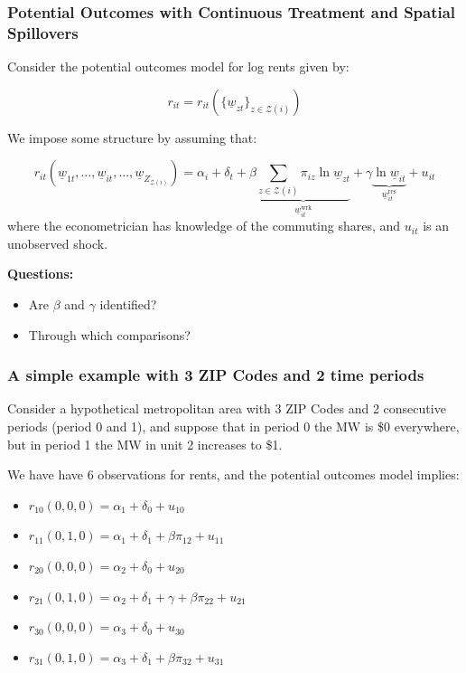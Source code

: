 \documentclass[aspectratio=169, t]{beamer}
\newcommand{\Z}{\mathcal{Z}}
\newcommand{\MW}{\underline{w}}
\begin{document}
\begin{frame}
	\frametitle{Potential Outcomes with Continuous Treatment and Spatial Spillovers}
	Consider the potential outcomes model for log rents given by:

	\[
	r_{it}=r_{it}\left(\{\underline{w}_{zt}\}_{z\in\Z(i)}\right)
	\]

	We impose some structure by assuming that:

	\[
	r_{it}(\underline{w}_{1t},...,\underline{w}_{it}, ..., \underline{w}_{Z_{\Z(i)}}) = \alpha_{i} + 
	\delta_{t} + \beta \underbrace{\sum_{z\in\Z(i)}\pi_{iz}\ln \underline{w}_{zt}}_{\MW^{\text{wrk}}_{it}} +
	\gamma \underbrace{\ln \underline{w}_{it}}_{\MW^{\text{res}}_{it}} + u_{it}
	\]
	where the econometrician has knowledge of the commuting shares, and $u_{it}$ is an unobserved shock.

	\pause 

	\vspace{2mm}

	\textbf{Questions:} 
	\begin{itemize}
		\item Are $\beta$ and $\gamma$ identified? 
		\item Through which comparisons? 
	\end{itemize}
\end{frame}

\begin{frame}
	\frametitle{A simple example with 3 ZIP Codes and 2 time periods}

	Consider a hypothetical metropolitan area with 3 ZIP Codes and 2 consecutive 
	periods (period 0 and 1), and suppose that in period 0 the MW is \$0 everywhere, but in period 1 the MW
	in unit 2 increases to \$1.

	\pause 
	\vspace{2mm}

	We have have 6 observations for rents, and the potential outcomes model implies:
	\begin{itemize}
		\item $r_{10}(0,0,0)=\alpha_{1}+\delta_{0}+u_{10}$
		\item $r_{11}(0,1,0)=\alpha_{1}+\delta_{1}+\beta\pi_{12}+u_{11}$
		\item $r_{20}(0,0,0)=\alpha_{2}+\delta_{0}+u_{20}$
		\item $r_{21}(0,1,0)=\alpha_{2}+\delta_{1}+\gamma+\beta\pi_{22}+u_{21}$
		\item $r_{30}(0,0,0)=\alpha_{3}+\delta_{0}+u_{30}$
		\item $r_{31}(0,1,0)=\alpha_{3}+\delta_{1}+\beta\pi_{32}+u_{31}$
	\end{itemize}
\end{frame}
\end{document}

